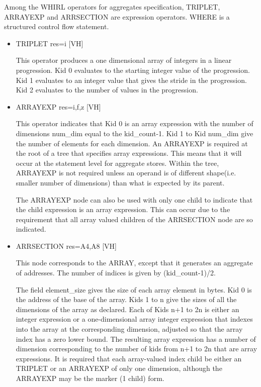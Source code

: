 \documentclass{article}
\begin{document}
Among the WHIRL operators for aggregates specification, TRIPLET,
ARRAYEXP and ARRSECTION are expression operators. WHERE is a
structured control flow statement.

\begin{itemize}
\item  TRIPLET res=i \hfill [VH]

This operator produces a one dimensional array of integers in a
linear progression. Kid 0 evaluates to the starting integer value
of the progression. Kid 1 evaluates to an integer value that gives
the stride in the progression. Kid 2 evaluates to the number of
values in the progression.

\item  ARRAYEXP res=i,f,z \hfill [VH]

This operator indicates that Kid 0 is an array expression with the
number of dimensions num\_dim equal to the kid\_count-1. Kid 1 to Kid
num\_dim give the number of elements for each dimension. An ARRAYEXP is
required at the root of a tree that specifies array expressions.
This means that it will occur at the statement level for aggregate
stores. Within the tree,
ARRAYEXP is not required unless an operand is of different shape(i.e.
smaller number of dimensions) than what is expected by its parent.

The ARRAYEXP node can also be used with only one child to indicate
that the child expression is an array expression. This can occur
due to the requirement that all array valued children of the
ARRSECTION node are so indicated.

\item  ARRSECTION res=A4,A8 \hfill [VH]

This node corresponds to the ARRAY, except that it generates an
aggregate of addresses. The number of indices is given by
(kid\_count-1)/2.

The field element\_size gives the size of each array element in
bytes. Kid 0 is the address of the base of the array. Kids 1 to n
give the sizes of all the dimensions of the array as declared. Each
of Kids n+1 to 2n is either an integer expression or a one-dimensional
array integer expression that indexes into the array at the
corresponding dimension, adjusted so that the array index has a zero
lower bound. The resulting array expression has a number of dimension
corresponding to the number of kids from n+1 to 2n that are array
expressions. It is required that each array-valued index child be
either an TRIPLET or an ARRAYEXP of only one dimension, although
the ARRAYEXP may be the marker (1 child) form.


\end{itemize}
\end{document}
